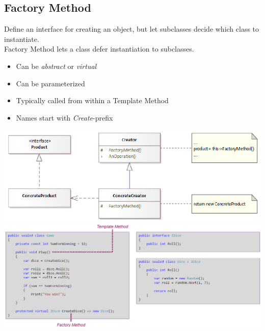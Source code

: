 
\subsection{Factory Method}
Define an interface for creating an object, but let subclasses decide which class to instantiate.\\
Factory Method lets a class defer instantiation to subclasses.\\
\begin{itemize}
    \item Can be \textit{abstract} or \textit{virtual}
    \item Can be parameterized
    \item Typically called from within a Template Method
    \item Names start with \textit{Create}-prefix
\end{itemize}

\includegraphics[width=\linewidth]{../img/factory_method.png}
\includegraphics[width=\linewidth]{../img/factory_method_code.png}

